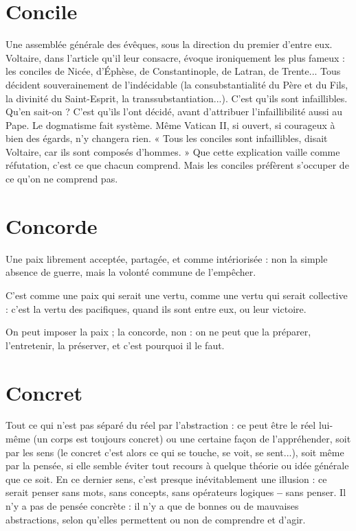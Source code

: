 \section{Concile}
Une assemblée générale des évêques, sous la direction du premier
d’entre eux. Voltaire, dans l’article qu’il leur consacre,
évoque ironiquement les plus fameux : les conciles de Nicée, d’Éphèse, de
Constantinople, de Latran, de Trente... Tous décident souverainement de
l’indécidable (la consubstantialité du Père et du Fils, la divinité du Saint-Esprit,
la transsubstantiation...). C’est qu’ils sont infaillibles. Qu’en sait-on ? C’est
qu’ils l'ont décidé, avant d’attribuer l’infaillibilité aussi au Pape. Le dogmatisme
fait système. Même Vatican II, si ouvert, si courageux à bien des égards,
n’y changera rien. « Tous les conciles sont infaillibles, disait Voltaire, car ils
sont composés d’hommes. » Que cette explication vaille comme réfutation,
c'est ce que chacun comprend. Mais les conciles préfèrent s'occuper de ce
qu’on ne comprend pas.

\section{Concorde}
Une paix librement acceptée, partagée, et comme intériorisée :
non la simple absence de guerre, mais la volonté commune de l'empêcher.

C’est comme une paix qui serait une vertu, comme une vertu qui serait
collective : c’est la vertu des pacifiques, quand ils sont entre eux, ou leur victoire.

On peut imposer la paix ; la concorde, non : on ne peut que la préparer,
l’entretenir, la préserver, et c’est pourquoi il le faut.

\section{Concret}
Tout ce qui n’est pas séparé du réel par l’abstraction : ce peut
être le réel lui-même (un corps est toujours concret) ou une
certaine façon de l’appréhender, soit par les sens (le concret c’est alors ce qui se
touche, se voit, se sent...), soit même par la pensée, si elle semble éviter tout
recours à quelque théorie ou idée générale que ce soit. En ce dernier sens, c’est
presque inévitablement une illusion : ce serait penser sans mots, sans concepts,
sans opérateurs logiques {\bf --} sans penser. Il n’y a pas de pensée concrète : il n'y a
que de bonnes ou de mauvaises abstractions, selon qu’elles permettent ou non
de comprendre et d’agir.

